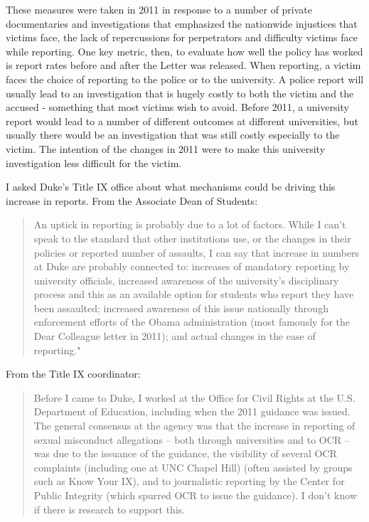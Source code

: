 \documentclass[AER]{AEA}
\begin{document}
These measures were taken in 2011 in response to a number of private documentaries and investigations that emphasized the nationwide injustices that victims face, the lack of repercussions for perpetrators and difficulty victims face while reporting. One key metric, then, to evaluate how well the policy has worked is report rates before and after the Letter was released. When reporting, a victim faces the choice of reporting to the police or to the university. A police report will usually lead to an investigation that is hugely costly to both the victim and the accused - something that most victims wish to avoid. Before 2011, a university report would lead to a number of different outcomes at different universities, but usually there would be an investigation that was still costly especially to the victim. The intention of the changes in 2011 were to make this university investigation less difficult for the victim.

I asked Duke's Title IX office about what mechanisms could be driving this increase in reports. From the Associate Dean of Students:

\begin{quote}
An uptick in reporting is probably due to a lot of factors. While I can’t speak to the standard that other institutions use, or the changes in their policies or reported number of assaults, I can say that increase in numbers at Duke are probably connected to: increases of mandatory reporting by university officials, increased awareness of the university’s disciplinary process and this as an available option for students who report they have been assaulted; increased awareness of this issue nationally through enforcement efforts of the Obama administration (most famously for the Dear Colleague letter in 2011); and actual changes in the ease of reporting."
\end{quote}

From the Title IX coordinator:

\begin{quote}
Before I came to Duke, I worked at the Office for Civil Rights at the U.S. Department of Education, including when the 2011 guidance was issued. The general consensus at the agency was that the increase in reporting of sexual misconduct allegations – both through universities and to OCR – was due to the issuance of the guidance, the visibility of several OCR complaints (including one at UNC Chapel Hill) (often assisted by groups such as Know Your IX), and to journalistic reporting by the Center for Public Integrity (which spurred OCR to issue the guidance). I don’t know if there is research to support this.
\end{quote}
\end{document}
